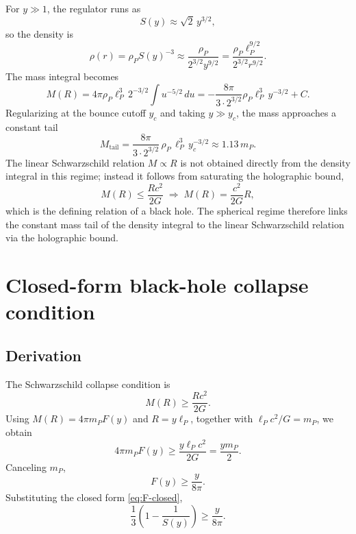 \documentclass[a4paper,1pt,oneside,openany]{book}
\begin{document}
For $y\gg 1$, the regulator runs as
\begin{equation}
S(y)\approx\sqrt{2}\,y^{3/2},
\label{eq:S-high}
\end{equation}
so the density is
\begin{equation}
\rho(r)=\rho_{P}S(y)^{-3}
\approx
\frac{\rho_{P}}{2^{3/2}y^{9/2}}
=
\frac{\rho_{P}\ell_{P}^{9/2}}{2^{3/2}r^{9/2}}.
\label{eq:rho-high}
\end{equation}
The mass integral becomes
\begin{equation}
M(R)
=
4\pi\rho_{P}\ell_{P}^{3}\,2^{-3/2}
\int u^{-5/2}\,du
=
-\frac{8\pi}{3\cdot 2^{3/2}}\rho_{P}\ell_{P}^{3}\,y^{-3/2}
+
C.
\label{eq:M-high-raw}
\end{equation}
Regularizing at the bounce cutoff $y_{c}$ and taking $y\gg 
y_{c}$, the mass approaches a constant tail
\begin{equation}
M_{\text{tail}}
=
\frac{8\pi}{3\cdot 2^{3/2}}\,\rho_{P}\,\ell_{P}^{3}\,y_{c}^{-3/2}
\approx
1.13\,m_{P}.
\label{eq:M-tail}
\end{equation}
The linear Schwarzschild relation $M\propto R$ is not obtained 
directly from the density integral in this regime; instead it 
follows from saturating the holographic bound,
\begin{equation}
M(R)\le \frac{Rc^{2}}{2G}
\;\Longrightarrow\;
M(R)=\frac{c^{2}}{2G}R,
\label{eq:Schwarzschild}
\end{equation}
which is the defining relation of a black hole. The spherical 
regime therefore links the constant mass tail of the density 
integral to the linear Schwarzschild relation via the 
holographic bound.

\section{Closed-form black-hole collapse condition}

\subsection{Derivation}

The Schwarzschild collapse condition is
\begin{equation}
M(R)\ge\frac{Rc^{2}}{2G}.
\label{eq:collapse}
\end{equation}
Using $M(R)=4\pi m_{P}F(y)$ and $R=y\ell_{P}$, together with 
$\ell_{P}c^{2}/G=m_{P}$, we obtain
\begin{equation}
4\pi m_{P}F(y)\ge\frac{y\ell_{P}c^{2}}{2G}
=\frac{y m_{P}}{2}.
\label{eq:collapse-step1}
\end{equation}
Canceling $m_{P}$,
\begin{equation}
\boxed{\;F(y)\ge\frac{y}{8\pi}.\;}
\label{eq:collapse-condition}
\end{equation}
Substituting the closed form \eqref{eq:F-closed},
\begin{equation}
\frac{1}{3}\left(1-\frac{1}{S(y)}\right)\ge\frac{y}{8\pi}.
\label{eq:collapse-final}
\end{equation}
\end{document}
